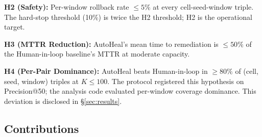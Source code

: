 \textbf{H2 (Safety):} Per-window rollback rate $\leq 5\%$ at every
cell-seed-window triple. The hard-stop threshold (10\%) is twice
the H2 threshold; H2 is the operational target.

\textbf{H3 (MTTR Reduction):} AutoHeal's mean time to remediation
is $\leq 50\%$ of the Human-in-loop baseline's MTTR at moderate
capacity.

\textbf{H4 (Per-Pair Dominance):} AutoHeal beats Human-in-loop in
$\geq 80\%$ of (cell, seed, window) triples at $K \leq 100$. The
protocol registered this hypothesis on Precision@50; the analysis
code evaluated per-window coverage dominance. This deviation is
disclosed in \S\ref{sec:results}.

\subsection{Contributions}

